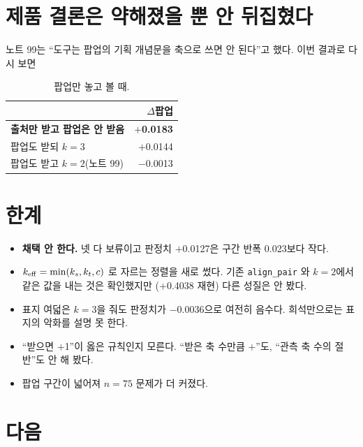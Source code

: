 \documentclass[10pt]{article}
\begin{document}
\section{제품 결론은 약해졌을 뿐 안 뒤집혔다}

노트 99는 ``도구는 팝업의 기획 개념문을 축으로 쓰면 안 된다''고 했다. 이번
결과로 다시 보면

\begin{table}[t]
\centering\tsize
\caption{팝업만 놓고 볼 때.}
\begin{tabular}{lr}
\toprule
& $\Delta$팝업 \\
\midrule
\textbf{출처만 받고 팝업은 안 받음} & \textbf{$+$0.0183} \\
팝업도 받되 $k{=}3$ & $+$0.0144 \\
팝업도 받고 $k{=}2$(노트 99) & $-$0.0013 \\
\bottomrule
\end{tabular}
\end{table}


\section{한계}

\begin{itemize}[leftmargin=1.1em,itemsep=0.15em]
\item \textbf{채택 안 한다.} 넷 다 보류이고 판정치 $+$0.0127은 구간 반폭
      0.023보다 작다.
\item $k_{\rm eff}=\min(k_s,k_t,c)$ 로 자르는 정렬을 새로 썼다. 기존
      \texttt{align\_pair} 와 $k{=}2$에서 같은 값을 내는 것은 확인했지만
      ($+$0.4038 재현) 다른 성질은 안 봤다.
\item 표지 여덟은 $k{=}3$을 줘도 판정치가 $-$0.0036으로 여전히 음수다.
      희석만으로는 표지의 악화를 설명 못 한다.
\item ``받으면 $+$1''이 옳은 규칙인지 모른다. ``받은 축 수만큼 $+$''도,
      ``관측 축 수의 절반''도 안 해 봤다.
\item 팝업 구간이 넓어져 $n{=}75$ 문제가 더 커졌다.
\end{itemize}

\section{다음}
\end{document}
